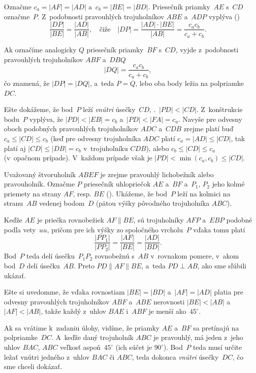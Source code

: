 {%
Označme $c_a = |AF| = |AD|$ a~$c_b = |BE| = |BD|$. Priesečník priamky~$AE$
s~$CD$ označme~$P$. Z~podobnosti pravouhlých trojuholníkov $ABE$
a~$ADP$ vyplýva (\obr)
$$
\frac {|DP|}{|BE|} = \frac {|AD|}{|AB|},
\quad\text{čiže}\quad
|DP| = \frac {|AD|\cdot|BE|}{|AB|} =\frac{c_ac_b} {c_a+c_b} .
$$

Ak označíme analogicky $Q$ priesečník priamky~$BF$ s~$CD$, vyjde z~podobnosti
pravouhlých trojuholníkov $ABF$ a~$DBQ$
$$
|DQ| = \frac {c_ac_b}{c_a+c_b},
$$
čo znamená, že $|DP| = |DQ|$, a~teda $P = Q$, lebo oba body ležia na
polpriamke~$DC$.
%

Ešte dokážeme, že bod~$P$ leží {\it vnútri\/} úsečky~$CD$, \tj.~$|PD| <|CD|$.
Z~konštrukcie bodu~$P$ vyplýva, že $|PD|<|EB|=c_b$ a~$|PD|<|FA|=c_a$.
Navyše pre odvesny oboch podobných pravouhlých trojuholníkov $ADC$ a~$CDB$
zrejme platí buď $c_a\le |CD|\le c_b$ (keď pre odvesny
trojuholníka $ADC$ platí $c_a=|AD|\le|CD|$, tak platí aj $|CD|\le|DB|=c_b$
v~trojuholníku $CDB$), alebo $c_b\le |CD|\le c_a$ (v~opačnom prípade).
V~každom prípade však je $|PD|<\min(c_a,c_b)\le |CD|$.

\ineres
Uvažovaný štvoruholník $ABEF$ je zrejme pravouhlý lichobežník alebo pravouholník.
Označme $P$ priesečník uhlopriečok $AE$ a~$BF$ a~$P_1$, $P_2$
jeho kolmé priemety na strany $AF$, resp. $BE$ (\obr).
Ukážeme, že bod~$P$ leží na kolmici na stranu~$AB$ vedenej bodom~$D$
(pätou výšky pôvodného trojuholníka $ABC$).
%

Keďže $AE$ je priečka rovnobežiek $AF\parallel BE$, sú trojuholníky $AFP$ a~$EBP$
podobné podľa vety~$uu$, pričom pre ich výšky zo spoločného vrcholu~$P$
vďaka tomu platí
$$
\frac{|PP_1|}{|PP_2|}=\frac{|AF|}{|BE|}=\frac{|AD|}{|BD|}.
$$
Bod~$P$ teda delí úsečku~$P_1P_2$ rovnobežnú s~$AB$ v~rovnakom pomere, v~akom
bod~$D$ delí úsečku~$AB$. Preto $PD\parallel AF\parallel BE$, a~teda $PD\perp AB$,
ako sme sľúbili ukázať.

Ešte si uvedomme, že vďaka rovnostiam $|BE|=|BD|$ a~$|AF|=|AD|$ platia
pre odvesny pravouhlých trojuholníkov $ABF$ a~$ABE$ nerovnosti
$|BE|<|AB|$ a~$|AF|<|AB|$, takže každý z~uhlov $BAE$ i~$ABF$ je menší ako~$45^\circ$.

Ak sa vrátime k~zadaniu úlohy, vidíme, že priamky $AE$ a~$BF$
sa pretínajú na polpriamke~$DC$. A~keďže daný trojuholník $ABC$ je pravouhlý,
má jeden z~jeho uhlov $BAC$, $ABC$
veľkosť aspoň~$45^\circ$ (ich súčet je $90^\circ$). Bod~$P$ teda musí
určite ležať vnútri jedného z~uhlov $BAC$ či $ABC$, teda dokonca {\it vnútri\/}
úsečky~$DC$, čo sme chceli dokázať.



}
